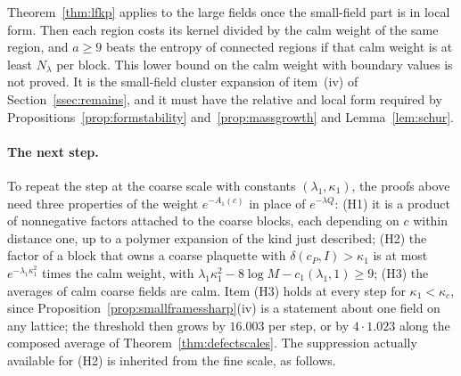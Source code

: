 \documentclass[11pt]{amsart}
\theoremstyle{definition}
\theoremstyle{remark}
\numberwithin{equation}{section}
\begin{document}
Theorem~\ref{thm:lfkp} applies to the large fields once the small-field
part is in local form. Then each region costs its kernel divided by the
calm weight of the same region, and $a\ge9$ beats the entropy of connected
regions if that calm weight is at least $N_\lambda$ per block. This lower
bound on the calm weight with boundary values is not proved. It is the
small-field cluster expansion of item~(iv) of Section~\ref{ssec:remains}, and
it must have the relative and local form required by
Propositions~\ref{prop:formstability} and~\ref{prop:massgrowth} and
Lemma~\ref{lem:schur}.

\paragraph*{The next step.}
To repeat the step at the coarse scale with constants $(\lambda_1,
\kappa_1)$, the proofs above need three properties of the weight
$e^{-A_1(c)}$ in place of $e^{-\lambda Q}$:
(H1) it is a product of nonnegative factors attached to the coarse blocks,
each depending on $c$ within distance one, up to a polymer expansion of the
kind just described;
(H2) the factor of a block that owns a coarse plaquette with $\delta(c_P,I)
>\kappa_1$ is at most $e^{-\lambda_1\kappa_1^2}$ times the calm weight,
with $\lambda_1\kappa_1^2-8\log M-c_1(\lambda_1,1)\ge9$;
(H3) the averages of calm coarse fields are calm.
Item (H3) holds at every step for $\kappa_1<\kappa_c$, since
Proposition~\ref{prop:smallframessharp}(iv) is a statement about one field
on any lattice; the threshold then grows by $16.003$ per step, or by
$4\cdot1.023$ along the composed average of Theorem~\ref{thm:defectscales}.
The suppression actually available for (H2) is inherited from the fine
scale, as follows.
\end{document}
